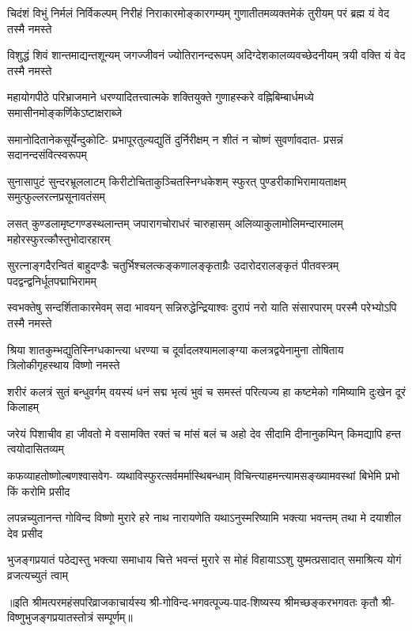 
\begin{AutoCols}[\maxColumns]
\fourlineindentedshloka
{चिदंशं विभुं निर्मलं निर्विकल्पम्‌}
{निरीहं निराकारमोङ्कारगम्यम्‌}
{गुणातीतमव्यक्तमेकं तुरीयम्‌}
{परं ब्रह्म यं वेद तस्मै नमस्ते}%

\fourlineindentedshloka
{विशुद्धं शिवं शान्तमाद्यन्तशून्यम्‌}
{जगज्जीवनं ज्योतिरानन्दरूपम्‌}
{अदिग्देशकालव्यवच्छेदनीयम्‌}
{त्रयी वक्ति यं वेद तस्मै नमस्ते}%

\fourlineindentedshloka
{महायोगपीठे परिभ्राजमाने}
{धरण्यादितत्त्वात्मके शक्तियुक्ते}
{गुणाहस्करे वह्निबिम्बार्धमध्ये}
{समासीनमोङ्कर्णिकेऽष्टाक्षराब्जे}%

\fourlineindentedshloka
{समानोदितानेकसूर्येन्दुकोटि-}
{प्रभापूरतुल्यद्युतिं दुर्निरीक्षम्‌}
{न शीतं न चोष्णं सुवर्णावदात-}
{प्रसन्नं सदानन्दसंवित्स्वरूपम्‌}%

\fourlineindentedshloka
{सुनासापुटं सुन्दरभ्रूललाटम्‌}
{किरीटोचिताकुञ्चितस्निग्धकेशम्‌}
{स्फुरत् पुण्डरीकाभिरामायताक्षम्‌}
{समुत्फुल्लरत्नप्रसूनावतंसम्‌}%

\fourlineindentedshloka
{लसत् कुण्डलामृष्टगण्डस्थलान्तम्‌}
{जपारागचोराधरं चारुहासम्‌}
{अलिव्याकुलामोलिमन्दारमालम्‌}
{महोरस्फुरत्कौस्तुभोदारहारम्‌}%

\fourlineindentedshloka
{सुरत्नाङ्गदैरन्वितं बाहुदण्डैः}
{चतुर्भिश्चलत्कङ्कणालङ्कृताग्रैः}
{उदारोदरालङ्कृतं पीतवस्त्रम्‌}
{पदद्वन्द्वनिर्धूतपद्माभिरामम्‌}%

\fourlineindentedshloka
{स्वभक्तेषु सन्दर्शिताकारमेवम्‌}
{सदा भावयन् सन्निरुद्धेन्द्रियाश्वः}
{दुरापं नरो याति संसारपारम्‌}
{परस्मै परेभ्योऽपि तस्मै नमस्ते}%

\fourlineindentedshloka
{श्रिया शातकुम्भद्युतिस्निग्धकान्त्या}
{धरण्या च दूर्वादलश्यामलाङ्ग्या}
{कलत्रद्वयेनामुना तोषिताय}
{त्रिलोकीगृहस्थाय विष्णो नमस्ते}%

\fourlineindentedshloka
{शरीरं कलत्रं सुतं बन्धुवर्गम्‌}
{वयस्यं धनं सद्म भृत्यं भुवं च}
{समस्तं परित्यज्य हा कष्टमेको}
{गमिष्यामि दुःखेन दूरं किलाहम्‌}%

\fourlineindentedshloka
{जरेयं पिशाचीव हा जीवतो मे}
{वसामक्ति रक्तं च मांसं बलं च}
{अहो देव सीदामि दीनानुकम्पिन्}
{किमद्यापि हन्त त्वयोदासितव्यम्‌}%

\fourlineindentedshloka
{कफव्याहतोष्णोल्बणश्वासवेग-}
{व्यथाविस्फुरत्सर्वमर्मास्थिबन्धाम्‌}
{विचिन्त्याहमन्त्यामसङ्ख्यामवस्थां}
{बिभेमि प्रभो किं करोमि प्रसीद}%

\fourlineindentedshloka
{लपन्नच्युतानन्त गोविन्द विष्णो}
{मुरारे हरे नाथ नारायणेति}
{यथाऽनुस्मरिष्यामि भक्त्या भवन्तम्‌}
{तथा मे दयाशील देव प्रसीद}%

\fourlineindentedshloka
{भुजङ्गप्रयातं पठेद्यस्तु भक्त्या}
{समाधाय चित्ते भवन्तं मुरारे}
{स मोहं विहायाऽऽशु युष्मत्प्रसादात्}
{समाश्रित्य योगं व्रजत्यच्युतं त्वाम्‌}%
\end{AutoCols}

॥इति श्रीमत्परमहंसपरिव्राजकाचार्यस्य श्री-गोविन्द-भगवत्पूज्य-पाद-शिष्यस्य
श्रीमच्छङ्करभगवतः कृतौ श्री-विष्णुभुजङ्गप्रयातस्तोत्रं सम्पूर्णम्‌॥

